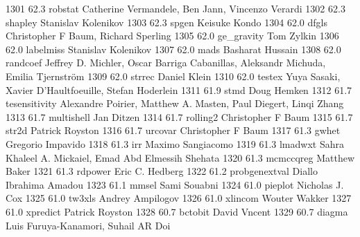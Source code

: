   1301     62.3    robstat       Catherine Vermandele, Ben Jann,         
                                   Vincenzo Verardi                        
  1302     62.3    shapley       Stanislav Kolenikov                     
  1303     62.3    spgen         Keisuke Kondo                           
  1304     62.0    dfgls         Christopher F Baum, Richard Sperling    
  1305     62.0    ge_gravity    Tom Zylkin                              
  1306     62.0    labelmiss     Stanislav Kolenikov                     
  1307     62.0    mads          Basharat Hussain                        
  1308     62.0    randcoef      Jeffrey D. Michler, Oscar Barriga       
                                   Cabanillas, Aleksandr Michuda, Emilia   
                                   Tjernström                             
  1309     62.0    strrec        Daniel Klein                            
  1310     62.0    testex        Yuya Sasaki, Xavier D'Haultfoeuille,    
                                   Stefan Hoderlein                        
  1311     61.9    stmd          Doug Hemken                             
  1312     61.7    tesensitivity  Alexandre Poirier, Matthew A. Masten,   
                                   Paul Diegert, Linqi Zhang               
  1313     61.7    multishell    Jan Ditzen                              
  1314     61.7    rolling2      Christopher F Baum                      
  1315     61.7    str2d         Patrick Royston                         
  1316     61.7    urcovar       Christopher F Baum                      
  1317     61.3    gwhet         Gregorio Impavido                       
  1318     61.3    irr           Maximo Sangiacomo                       
  1319     61.3    lmadwxt       Sahra Khaleel A. Mickaiel, Emad Abd     
                                   Elmessih Shehata                        
  1320     61.3    mcmccqreg     Matthew Baker                           
  1321     61.3    rdpower       Eric C. Hedberg                         
  1322     61.2    probgenextval  Diallo Ibrahima Amadou                  
  1323     61.1    mmsel         Sami Souabni                            
  1324     61.0    pieplot       Nicholas J. Cox                         
  1325     61.0    tw3xls        Andrey Ampilogov                        
  1326     61.0    xlincom       Wouter Wakker                           
  1327     61.0    xpredict      Patrick Royston                         
  1328     60.7    bctobit       David Vncent                            
  1329     60.7    diagma        Luis Furuya-Kanamori, Suhail AR Doi     
